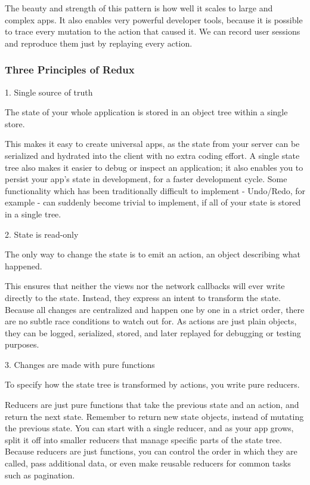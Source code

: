 The beauty and strength of this pattern is how well it scales to large and complex apps. It also enables very powerful developer tools, because it is possible to trace every mutation to the action that caused it. We can record user sessions and reproduce them just by replaying every action.\citep{redux-intro}

\subsubsection{Three Principles of Redux}
1. Single source of truth

The state of your whole application is stored in an object tree within a single store.

This makes it easy to create universal apps, as the state from your server can be serialized and hydrated into the client with no extra coding effort. A single state tree also makes it easier to debug or inspect an application; it also enables you to persist your app's state in development, for a faster development cycle. Some functionality which has been traditionally difficult to implement - Undo/Redo, for example - can suddenly become trivial to implement, if all of your state is stored in a single tree.

2. State is read-only

The only way to change the state is to emit an action, an object describing what happened.

This ensures that neither the views nor the network callbacks will ever write directly to the state. Instead, they express an intent to transform the state. Because all changes are centralized and happen one by one in a strict order, there are no subtle race conditions to watch out for. As actions are just plain objects, they can be logged, serialized, stored, and later replayed for debugging or testing purposes.

3. Changes are made with pure functions

To specify how the state tree is transformed by actions, you write pure reducers.

Reducers are just pure functions that take the previous state and an action, and return the next state. Remember to return new state objects, instead of mutating the previous state. You can start with a single reducer, and as your app grows, split it off into smaller reducers that manage specific parts of the state tree. Because reducers are just functions, you can control the order in which they are called, pass additional data, or even make reusable reducers for common tasks such as pagination.

